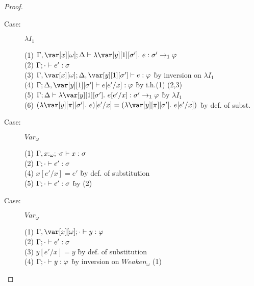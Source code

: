 \begin{proof}
\begin{description}
\item[Case:] $\lambda I_1$
\begin{tabbing}
  (1) $\G, \xo; \D \vdash \lambda\y[1][\s'].~e : \s'\to_1\vp$\\
  (2) $\Gamma; \cdot \vdash e' : \sigma$\\
  (3) $\G, \xo; \D, \y[1][\s'] \vdash e : \vp$ \` by inversion on $\lambda I_1$\\
  (4) $\G; \D, \y[1][\s'] \vdash e[e'/x] : \vp$ \` by i.h.(1) (2,3)\\
  (5) $\G; \D \vdash \lambda\y[1][\s'].~e[e'/x] : \s' \to_1\vp$ \` by $\lambda I_1$\\
  (6) $(\lambda \y[\pi][\s'].~e)[e'/x] = (\lambda \y[\pi][\s'].~e[e'/x])$ \` by def. of subst.\\
\end{tabbing}


\item[Case:] $Var_\omega$
\begin{tabbing}
  (1) $\Gamma, x{:}_\omega; \cdot \sigma \vdash x : \sigma$\\
  (2) $\Gamma; \cdot \vdash e' : \sigma$\\
  (4) $x[e'/x] = e'$ \` by def. of substitution\\
  (5) $\Gamma; \cdot \vdash e' : \sigma$ \` by (2)\\
\end{tabbing}

\item[Case:] $Var_\omega$
\begin{tabbing}
  (1) $\G, \xo; \cdot \vdash y : \vp$\\
  (2) $\Gamma; \cdot \vdash e' : \sigma$\\
  (3) $y[e'/x] = y$ \` by def. of substitution\\
  (4) $\Gamma; \cdot \vdash y : \varphi$ \` by inversion on $Weaken_\omega$ (1)\\
\end{tabbing}


\end{description}
\end{proof}
